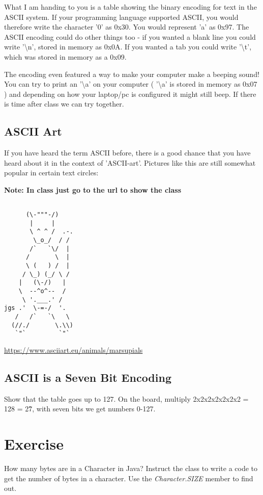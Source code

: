 \documentclass[12pt]{article}
\begin{document}
What I am handing to you is a table showing the binary encoding for text in the ASCII system. If your programming language supported ASCII, you would therefore write the character '0' as 0x30. You would represent 'a' as 0x97. The ASCII encoding could do other things too - if you wanted a blank line you could write '\textbackslash n', stored in memory as 0x0A. If you wanted a tab you could write '\textbackslash t', which was stored in memory as a 0x09.

The encoding even featured a way to make your computer make a beeping sound! You can try to print an '\textbackslash a' on your computer ( '\textbackslash a' is stored in memory as 0x07 ) and depending on how your laptop/pc is configured it might still beep. If there is time after class we can try together.

\subsection{ASCII Art}
If you have heard the term ASCII before, there is a good chance that you have heard about it in the context of 'ASCII-art'. Pictures like this are still somewhat popular in certain text circles:

\textbf{Note: In class just go to the url to show the class}

\begin{lstlisting}

      (\-"""-/)
       |     |
       \ ^ ^ /  .-.
        \_o_/  / /
       /`   `\/  |
      /       \  |
      \ (   ) /  |
     / \_) (_/ \ /
    |   (\-/)   |
    \  --^o^--  /
     \ '.___.' /
jgs .'  \-=-/  '.
   /   /`   `\   \
  (//./       \.\\)
   `"`         `"`

\end{lstlisting}

\url{https://www.asciiart.eu/animals/marsupials}

\subsection{ASCII is a Seven Bit Encoding}
Show that the table goes up to 127. On the board, multiply 2x2x2x2x2x2x2 = 128 = 2\^7, with seven bits we get numbers 0-127.

\section{Exercise}
How many bytes are in a Character in Java? Instruct the class to write a code to get the number of bytes in a character. Use the \textit{Character.SIZE} member to find out.
\end{document}
